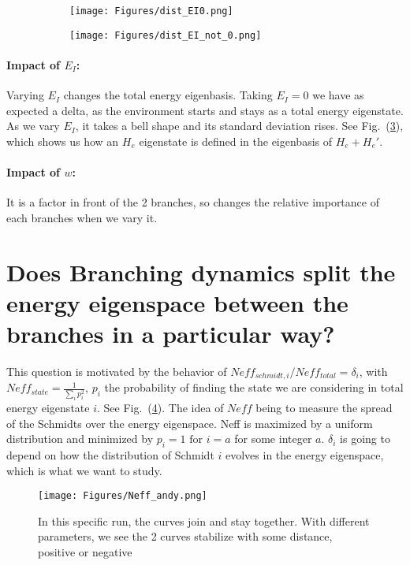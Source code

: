 \documentclass{article}
\begin{document}
\begin{figure}[h!]
  \centering
  \begin{subfigure}[b]{0.4\linewidth}
    \texttt{[image: Figures/dist\_EI0.png]}
    \label{fig:1}
  \end{subfigure}
  \begin{subfigure}[b]{0.4\linewidth}
    \texttt{[image: Figures/dist\_EI\_not\_0.png]}
    \label{fig:2}
  \end{subfigure}
  \caption{}
  \label{fig:dist_EI_dep}
\end{figure}

\paragraph{Impact of $E_I$: }Varying $E_I$ changes the total energy eigenbasis. Taking $E_I=0$ we have as expected a delta, as the environment starts and stays as a total energy eigenstate. As we vary $E_I$, it takes a bell shape and its standard deviation rises. See Fig.~(\ref{fig:dist_EI_dep}), which shows us how an $H_e$ eigenstate is defined in the eigenbasis of $H_e+H_e'$. 

\paragraph{Impact of $w$: }It is a factor in front of the 2 branches, so changes the relative importance of each branches when we vary it.

\section{Does Branching dynamics split the energy eigenspace between the branches in a particular way?}
This question is motivated by the behavior of $Neff_{schmidt,i}/Neff_{total}=\delta_i$, with $Neff_{state}=\frac{1}{\sum_ip_i^2}$, $p_i$ the probability of finding the state we are considering in total energy eigenstate $i$. See Fig.~(\ref{fig:Neff_andy}). The idea of $Neff$ being to measure the spread of the Schmidts over the energy eigenspace. Neff is maximized by a uniform distribution and minimized by $p_i=1\text{ for }i=a$ for some integer $a$. $\delta_i$ is going to depend on how the distribution of Schmidt $i$ evolves in the energy eigenspace, which is what we want to study.

\begin{figure}[h]
    \centering
    \texttt{[image: Figures/Neff\_andy.png]}
    \caption{In this specific run, the curves join and stay together. With different parameters, we see the 2 curves stabilize with some distance, positive or negative}
    \label{fig:Neff_andy}
\end{figure}
\end{document}
